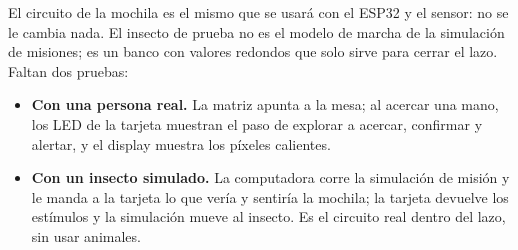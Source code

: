 El circuito de la mochila es el mismo que se usará con el ESP32 y el sensor: no se le cambia nada.
El insecto de prueba no es el modelo de marcha de la simulación de misiones; es un banco con
valores redondos que solo sirve para cerrar el lazo. Faltan dos pruebas:
\begin{itemize}
  \item \textbf{Con una persona real.} La matriz apunta a la mesa; al acercar una mano, los LED de
        la tarjeta muestran el paso de explorar a acercar, confirmar y alertar, y el display muestra
        los píxeles calientes.
  \item \textbf{Con un insecto simulado.} La computadora corre la simulación de misión y le manda
        a la tarjeta lo que vería y sentiría la mochila; la tarjeta devuelve los estímulos y la simulación
        mueve al insecto. Es el circuito real dentro del lazo, sin usar animales.
\end{itemize}

